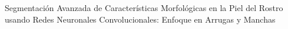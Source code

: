 \begin{center}
	\vspace*{10cm}
	{Segmentación Avanzada de Características Morfológicas en la Piel del Rostro usando Redes Neuronales Convolucionales: Enfoque en Arrugas y Manchas}
\end{center}

